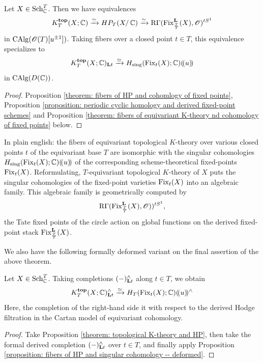 \begin{theorem}\label{theorem: fibers of topological K-theory, HP and fixed-points}
Let $X \in \operatorname{Sch}^{T}_{\operatorname{\mathbb{C}}}$. Then we have equivalences
\begin{equation}\label{equation: K, HP, Fix}
    K^{\mathbf{top}}_{T}(X; \operatorname{\mathbb{C}}) \xrightarrow{\simeq} HP_T(X / \operatorname{\mathbb{C}}) \xrightarrow{\simeq} \operatorname{R\Gamma}(\operatorname{Fix}^{\mathbf{L}}_{\frac{T}{T}}(X), \operatorname{\mathscr{O}})^{tS^1}
\end{equation}
in $\operatorname{CAlg}(\operatorname{\mathscr{O}}(T)[u^{\pm 1}])$. 
%
Taking fibers over a closed point $t \in T$, this equivalence specializes to
\begin{equation}\label{equation: fibers and singular cohomology of fixed-points}
    K^{\mathbf{top}}_T(X; \operatorname{\mathbb{C}})_{\mathbf{L} t} \xrightarrow{\simeq} H_{\mathrm{sing}}(\operatorname{Fix}_t(X); \operatorname{\mathbb{C}})(\!( u )\!)
\end{equation}
in $\operatorname{CAlg}(D(\operatorname{\mathbb{C}}))$.
\end{theorem}
\begin{proof}
Proposition \ref{theorem: fibers of HP and cohomlogy of fixed points}, Proposition \ref{proposition: periodic cyclic homology and derived fixed-point schemes} and Proposition \ref{theorem: fibers of equivariant K-theory nd cohomology of fixed points} below.
\end{proof}


\begin{remark}
In plain english: the fibers of equivariant topological $K$-theory over various closed points $t$ of the equivariant base $T$ are isomorphic with the singular cohomologies $H_{\mathrm{sing}}(\operatorname{Fix}_t(X); \operatorname{\mathbb{C}})(\!( u )\!)$ of the corresponding scheme-theoretical fixed-points $\operatorname{Fix}_t(X)$. Reformulating, $T$-equivariant topological $K$-theory of $X$ puts the singular cohomologies of the fixed-point varieties $\operatorname{Fix}_t(X)$ into an algebraic family.
This algebraic family is geometrically computed by 
$$\operatorname{R\Gamma}(\operatorname{Fix}^{\mathbf{L}}_{\frac{T}{T}}(X), \operatorname{\mathscr{O}}))^{tS^1},$$
the Tate fixed points of the circle action on global functions on the derived fixed-point stack $\operatorname{Fix}^{\mathbf{L}}_{\frac{T}{T}}(X)$.
\end{remark}

We also have the following formally deformed variant on the final assertion of the above theorem.
\begin{proposition}\label{remark: the completed variant of equivariant localization}
Let $X \in \operatorname{Sch}^{T}_{\operatorname{\mathbb{C}}}$. Taking completions $(-)^{\wedge}_{\mathbf{L} t}$ along $t \in T$, we obtain
\begin{equation}\label{equation: completed version K-theory}
  K^{\mathbf{top}}_T(X; \operatorname{\mathbb{C}})^{\wedge}_{\mathbf{L} t} \xrightarrow{\simeq} H_{T}(\operatorname{Fix}_t(X); \operatorname{\mathbb{C}}) (\!( u )\!)^{\wedge} 
\end{equation}
Here, the completion of the right-hand side it with respect to the derived Hodge filtration in the Cartan model of equivariant cohomology. 
\end{proposition}
\begin{proof}
Take Proposition \ref{theorem: topological K-theory and HP}, then take the formal derived completion $(-)^{\wedge}_{\mathbf{L} t}$ over $t \in T$, and finally apply Proposition \ref{proposition: fibers of HP and singular cohomology -- deformed}.
\end{proof}



